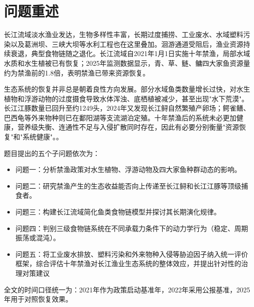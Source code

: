 \section{问题重述}
长江流域淡水渔业发达，生物多样性丰富，长期过度捕捞、工业废水、水域塑料污染以及葛洲坝、三峡大坝等水利工程也在这里叠加。洄游通道受阻后，渔业资源持续衰退，典型食物链随之退化。长江流域自2021年1月1日实施十年禁渔，局部水域水质和水生植被已有恢复；2025年监测数据显示，青、草、鲢、鳙四大家鱼资源量约为禁渔前的1.8倍，表明禁渔已带来资源恢复。

生态系统的恢复并非总是朝着良性方向发展。部分水域鱼类数量增长过快，对水生植物和浮游动物的过度摄食导致水体浑浊、底栖植被减少，甚至出现"水下荒漠"。长江江豚数量已回升至约1249头，2024年又发现长江鲟自然繁殖产卵场；鳄雀鳝、巴西龟等外来物种则已在鄱阳湖等支流湖泊定殖。十年禁渔后的系统未必更加健康，营养级失衡、连通性不足与入侵扩散同时存在，因此有必要分别衡量"资源恢复"和"系统健康"。\cite{report2022,report2023}。

题目提出的五个子问题依次为：
\begin{itemize}
\item 问题一：分析禁渔政策对水生植物、浮游动物及四大家鱼种群动态的影响。
\item 问题二：研究禁渔产生的生态收益能否向上传递至长江鲟和长江江豚等顶级捕食者。
\item 问题三：构建长江流域简化鱼类食物链模型并探讨其长期演化规律。
\item 问题四：判别三级食物链系统在不同承载力条件下的动力学行为（稳定、周期振荡或混沌）。
\item 问题五：将工业废水排放、塑料污染和外来物种入侵等胁迫因子纳入统一评价框架，综合评估十年禁渔对长江渔业生态系统的整体效应，并提出针对性的治理对策建议
\end{itemize}
全文的时间口径统一为：2021年作为政策启动基准年，2022年采用公报基准，2025年用于对照恢复效果\cite{yangtzeA}。

